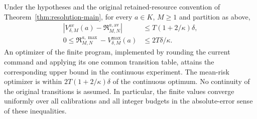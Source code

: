 \begin{theorem}\label{thm:v32-grid}
Under the hypotheses and the original retained-resource convention of
Theorem~\ref{thm:resolution-main}, for every $a\in K$, $M\ge1$ and
partition as above,
\begin{align}
 \left|V^{\mathrm{av}}_{\delta,M}(a)
               -\mathfrak R_{M,N}^{a,\mathrm{av}}\right|
       &\le T(1+2/\kappa)\delta,
                  \label{eq:v32-grid-average}\\
 0\le\mathfrak R_{M,N}^{a,\max}
               -V^{\max}_{\delta,M}(a)
       &\le 2T\delta/\kappa.
                  \label{eq:v32-grid-worst}
\end{align}
An optimizer of the finite program, implemented by rounding the current
command and applying its one common transition table, attains the
corresponding upper bound in the continuous experiment. The mean-risk
optimizer is within $2T(1+2/\kappa)\delta$ of the continuous optimum.
No continuity of the original transitions is assumed. In particular,
the finite values converge uniformly over all calibrations and all
integer budgets in the absolute-error sense of these inequalities.
\end{theorem}

